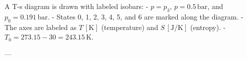 A T-s diagram is drawn with labeled isobars:  
- \( p = p_3 \), \( p = 0.5 \, \text{bar} \), and \( p_0 = 0.191 \, \text{bar} \).  
- States 0, 1, 2, 3, 4, 5, and 6 are marked along the diagram.  
- The axes are labeled as \( T \, [\text{K}] \) (temperature) and \( S \, [\text{J/K}] \) (entropy).  
- \( T_0 = 273.15 - 30 = 243.15 \, \text{K} \).  

---